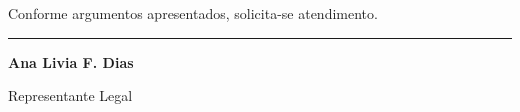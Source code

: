 \documentclass[11pt,a4paper]{article}
\begin{document}


Conforme argumentos apresentados, solicita-se atendimento.

\vspace{2cm}
\begin{center}
\noindent\rule{6cm}{0.4pt}

\textbf{Ana Livia F. Dias}

{\small Representante Legal}
\end{center}
\end{document}
